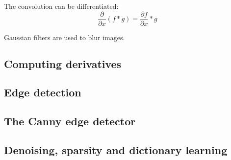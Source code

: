 The convolution can be differentiated:
\begin{equation*}
    \frac{\partial}{\partial x}(f*g) = \frac{\partial f}{\partial x}*g
\end{equation*}

Gaussian filters are used to blur images.

\subsection{Computing derivatives}

\subsection{Edge detection}

\subsection{The Canny edge detector}

\subsection{Denoising, sparsity and dictionary learning}